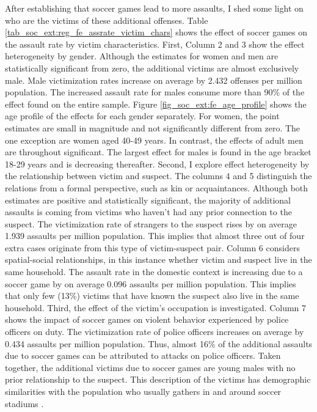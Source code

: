 \documentclass[11pt, a4paper]{article} %
\begin{document}
After establishing that soccer games lead to more assaults, I shed some light on who are the victims of these additional offenses. Table \ref{tab_soc_ext:reg_fe_assrate_victim_chars} shows the effect of soccer games on the assault rate by victim characteristics. First, Column 2 and 3 show the effect heterogeneity by gender. Although the estimates for women and men are statistically significant from zero, the additional victims are almost exclusively male. Male victimization rates increase on average by 2.432 offenses per million population. The increased assault rate for males consume more than 90\% of the effect found on the entire sample. Figure \ref{fig_soc_ext:fe_age_profile} shows the age profile of the effects for each gender separately. For women, the point estimates are small in magnitude and not significantly different from zero. The one exception are women aged 40-49 years. In contrast, the effects of adult men are throughout significant. The largest effect for males is found in the age bracket 18-29 years and is decreasing thereafter. Second, I explore effect heterogeneity by the relationship between victim and suspect. The columns 4 and 5 distinguish the relations from a formal perspective, such as kin or acquaintances. Although both estimates are positive and statistically significant, the majority of additional assaults is coming from victims who haven't had any prior connection to the suspect. The victimization rate of strangers to the suspect rises by on average 1.939 assaults per million population. This implies that almost three out of four extra cases originate from this type of victim-suspect pair. Column 6 considers spatial-social relationships, in this instance whether victim and suspect live in the same household. The assault rate in the domestic context is increasing due to a soccer game by on average 0.096 assaults per million population. This implies that only few (13\%) victims that have known the suspect also live in the same household. Third, the effect of the victim's occupation is investigated. Column 7 shows the impact of soccer games on violent behavior experienced by police officers on duty. The victimization rate of police officers increases on average by 0.434 assaults per million population. Thus, almost 16\% of the additional assaults due to soccer games can be attributed to attacks on police officers. Taken together, the additional victims due to soccer games are young males with no prior relationship to the suspect. This description of the victims has demographic similarities with the population who usually gathers in and around soccer stadiums \citep{pwc2016}.
\end{document}
